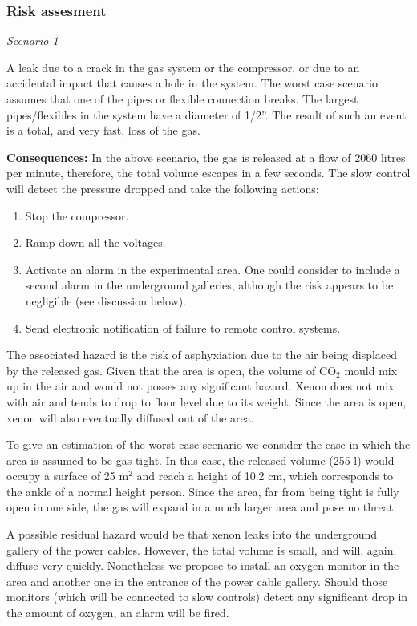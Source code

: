 \subsubsection{Risk assesment}

\textit{Scenario 1}

A leak due to a crack in the gas system or the compressor, or due to an accidental impact that causes a hole in the system. The worst case scenario assumes that one of the pipes or flexible connection breaks. The largest pipes/flexibles in the system have a diameter of 1/2''. The result of such an event is a total, and very fast, loss of the gas.  

\textbf{Consequences:} In the above scenario, the gas is released at a flow of 2060 litres per minute, therefore, the total volume escapes in a few seconds. The slow control will detect the pressure dropped and take the following actions:
\begin{enumerate}
\item Stop the compressor.
\item Ramp down all the voltages. 
\item Activate an alarm in the experimental area. One could consider to include a second alarm in the underground galleries, although the risk appears to be negligible (see discussion below). 
\item Send electronic notification of failure to remote control systems.
\end{enumerate}

The associated hazard is the risk of asphyxiation due to the air being displaced by the released gas. Given that the area is open, the volume of CO$_2$ mould mix up in the air and would not posses any significant hazard. Xenon does not mix with air and tends to drop to floor level due to its weight. Since the area is open, xenon will also eventually diffused out of the area. 

To give an estimation of the worst case scenario we consider the case in which the area is assumed to be gas tight. In this case, the released volume (255 l) would occupy a surface of 25 m$^2$ and reach a height of 10.2 cm, which corresponds to the ankle of a normal height person. Since the area, far from being tight is fully open in one side, the gas will expand in a much larger area and pose no threat. 

A possible residual hazard would be that xenon leaks into the underground gallery of the power cables. However, the total volume is small, and will, again, diffuse very quickly. Nonetheless we propose to install an oxygen monitor in the area and another one in the entrance of the power cable gallery. Should those monitors (which will be connected to slow controls) detect any significant drop in the amount of oxygen, an alarm will be fired. 



